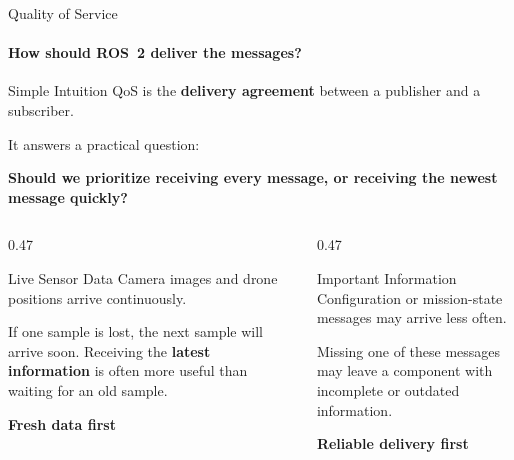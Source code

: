 \begin{frame}{Quality of Service}
\framesubtitle{How should ROS~2 deliver the messages?}

\footnotesize

\begin{block}{Simple Intuition}
    QoS is the \textbf{delivery agreement} between a publisher
    and a subscriber.

    It answers a practical question:

    \begin{center}
        \textbf{Should we prioritize receiving every message,
        or receiving the newest message quickly?}
    \end{center}
\end{block}

\pause

\begin{columns}[T,onlytextwidth]

    \begin{column}{0.47\textwidth}
        \begin{exampleblock}{Live Sensor Data}
            Camera images and drone positions arrive continuously.

            \vspace{0.12cm}

            If one sample is lost, the next sample will arrive soon.
            Receiving the \textbf{latest information} is often more useful
            than waiting for an old sample.

            \vspace{0.12cm}

            \centering
            \textbf{Fresh data first}
        \end{exampleblock}
    \end{column}

    \hfill

    \begin{column}{0.47\textwidth}
        \begin{exampleblock}{Important Information}
            Configuration or mission-state messages may arrive less often.

            \vspace{0.12cm}

            Missing one of these messages may leave a component with
            incomplete or outdated information.

            \vspace{0.12cm}

            \centering
            \textbf{Reliable delivery first}
        \end{exampleblock}
    \end{column}

\end{columns}

\end{frame}


